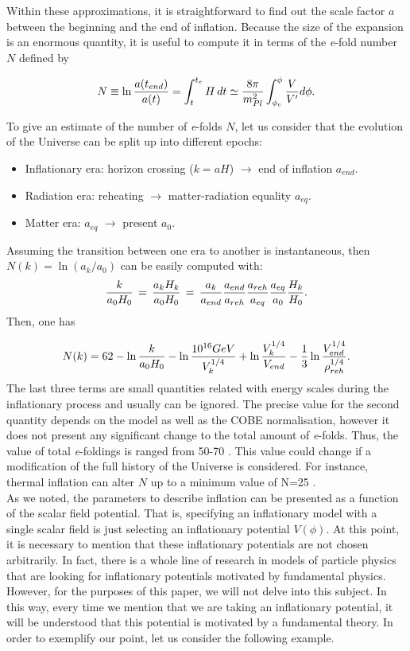 \documentclass{rmaa}
\begin{document}
Within these approximations, it is straightforward to find out the scale factor $a$ between
the beginning and the end of inflation. Because the size of the expansion is 
an enormous quantity, it is useful to compute it in terms of the 
 {\it e}-fold number $N$ defined by 
 
\begin{equation} \label{eq:N}
N \equiv \ln {a(t_{end}) \over a(t)}=
\int_{t}^{t_e}{H\,dt} \simeq 
{8\pi \over m^2_{Pl}} \int_{\phi_e}^{\phi} {V \over V'} d\phi .
\end{equation}

\noindent
To give an estimate of the number of \textit{e}-folds $N$, let us consider that the evolution of the Universe 
can be split up into different epochs:

\begin{itemize}
\item Inflationary era: horizon crossing ($k=aH$) $\to$ end of inflation $a_{end}$.
\item Radiation era: reheating $\to$ matter-radiation equality $a_{eq}$.
\item Matter era: $a_{eq}$ $\to$ present $a_{0}$.
\end{itemize}

\noindent
Assuming the transition between one era to another is instantaneous, then $N(k)= \ln ({a_k / a_0})$
can be easily computed with:
$$ 
{k\over a_0 H_0}\,=\,{a_k H_k \over a_0 H_0}\,=\,{a_k\over a_{end}}{a_{end}\over a_{reh}}
{a_{reh}\over a_{eq}}{a_{eq} \over a_0}{H_k\over H_0}.
$$
Then, one has \citep{LiddleLyth}

$$
N(k)=62-\ln{k \over a_0 H_0}-\ln{10^{16} GeV \over V_k^{1/4}}+\ln{V_k^{1/4} \over V_{end}}-
{1 \over 3}\ln{V_{end}^{1/4} \over \rho_{reh}^{1/4}}.
$$
%
The last three terms are small quantities related with energy scales during the inflationary 
process and usually can be ignored.
The precise value for the second quantity depends on the model as well as the 
COBE normalisation, however it does not present any significant change to the total 
amount of \textit{e}-folds. 
Thus, the value of total \textit{e}-foldings is ranged from 50-70 \citep{Lyth}. 
This value could change if a modification of the full history of the Universe is considered. 
For instance, thermal inflation can alter $N$ up to a minimum value of N=25 \citep{Lyth1,Lyth2}.
\\

As we noted, the parameters to describe inflation can be presented
as a function of the scalar field potential. That is, specifying an inflationary 
model with a single scalar field is just selecting an inflationary potential $V(\phi)$. 
At this point, it is necessary to mention that these inflationary potentials are not chosen arbitrarily. 
In fact, there is a whole line of research in models of particle physics that are looking for inflationary potentials 
motivated by fundamental physics. However, for the purposes of this paper, we will not delve into this subject. 
In this way, every time we mention that we are taking an inflationary potential, it will be 
understood that this potential is motivated by a fundamental theory. 
In order to exemplify our point, let us consider the following example.
\end{document}
